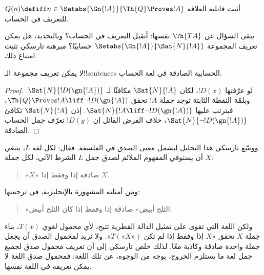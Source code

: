 \documentclass[../../../include/open-logic-section]{subfiles}
\begin{document}
\begin{prob}
أثبت قابلية العلاقة
$Q(n) \defiff n \in \Setabs{\Gn{!A}}{\Th{Q} \Proves !A}$
للتعريف في الحساب.
\end{prob}

يبقى السؤال عن $\Th{TA}$ نفسها: أتقبل التعريف في الحساب؟
وبالتحديد، هل يمكن تعريف المجموعة
$\Setabs{\Gn{!A}}{\Sat{N}{!A}}$ حسابيًا؟ مبرهنة تارسكي
تثبت امتناع ذلك.

\begin{thm}
لا يمكن تعريف مجموعة الـ!!{sentence}s الحسابية الصادقة
في لغة الحساب.
\end{thm}

\begin{proof}
لو عرّفتها $!D(x)$، لكان $\Sat{N}{!A}$ مكافئًا لـ
$\Sat{N}{!D(\gn{!A})}$. وبلمّة النقطة الثابتة توجد جملة $!A$
تحقق $\Th{Q} \Proves !A \liff \lnot !D(\gn{!A})$،
فيترتب عليها $\Sat{N}{!A \liff \lnot !D(\gn{!A})}$.
إذن $\Sat{N}{!A}$ تكافئ $\Sat{N}{\lnot !D(\gn{!A})}$،
خلاف الفرض القائل إن $!D(y)$ تعرّف جمل الحساب الصادقة.
\end{proof}

ووسّع تارسكي هذا التحليل ليشمل معنى الصدق في الفلسفة.
فقال: لكل لغة $L$، ينبغي أن يستوفي المفهوم الملائم لصدق جمل
$L$ الشرط الآتي، لكل جملة $X$:
\begin{quote}
«$X$» صادقة إذا وفقط إذا $X$.
\end{quote}
ومن أمثلته المشهورة بالإنجليزية، في ترجمتها:
\begin{quote}
«الثلج أبيض» صادقة إذا وفقط إذا كان الثلج أبيض.
\end{quote}
ولكن اللغة التي تقوى على تمثيل الدالة القطرية تتيح، لأي محمول
لغوي $T(x)$، بناء جملة $X$ تحقق «$X$ إذا وفقط إذا لم تكن
$T(\text{«$X$»})$». ولا نريد لمحمول الصدق أن يجعل جملة واحدة
صادقة وكاذبة معًا. لذلك خلص تارسكي إلى أن تعريف محمول صدق
لجميع جمل لغة ما يستلزم الخروج، بوجه من الوجوه، عن تلك اللغة:
فمحمول صدق اللغة لا يمكن تعريفه في اللغة نفسها.
\end{document}
